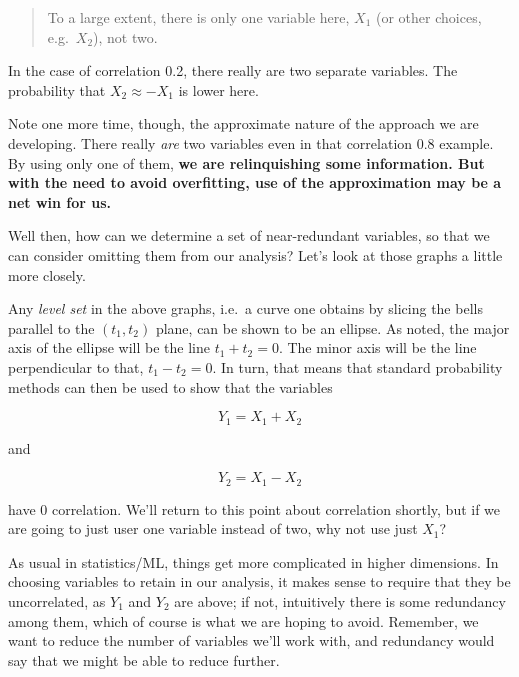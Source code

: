 \begin{quote}

To a large extent, there is only one variable here, $X_1$ (or other
choices, e.g.\ $X_2$), not two.  

\end{quote}

In the case of correlation 0.2, there really are two separate variables.
The probability that $X_2 \approx -X_1$ is lower here.

Note one more time, though, the approximate nature of the approach we
are developing.  There really \textit{are} two variables even in that
correlation 0.8 example.  By using only one of them, \textbf{we are
relinquishing some information.  But with the need to avoid overfitting,
use of the approximation may be a net win for us.}

Well then, how can we determine a set of near-redundant variables, so
that we can consider omitting them from our analysis?  Let's look at
those graphs a little more closely.

Any \textit{level set} in the above graphs, i.e.\ a curve one
obtains by slicing the bells parallel to the $(t_1,t_2)$ plane, can be
shown to be an ellipse.  As noted, the major axis of the ellipse will be
the line $t_1 + t_2 = 0$.  The minor axis will be the line perpendicular
to that, $t_1 - t_2 = 0$.  In turn, that means that standard probability
methods can then be used to show that the variables

\begin{equation}
Y_1 = X_1 + X_2 
\end{equation}

and 

\begin{equation}
Y_2 = X_1 - X_2 
\end{equation}

have 0 correlation.  We'll return to this point about correlation
shortly, but if we are going to just user one variable instead of two,
why not use just $X_1$?  

As usual in statistics/ML, things get more
complicated in higher dimensions.  In choosing variables to retain in
our analysis, it makes sense to require that they be uncorrelated, as
$Y_1$ and $Y_2$ are above; if not, intuitively there is some redundancy
among them, which of course is what we are hoping to avoid.  Remember,
we want to reduce the number of variables we'll work with, and
redundancy would say that we might be able to reduce further.

